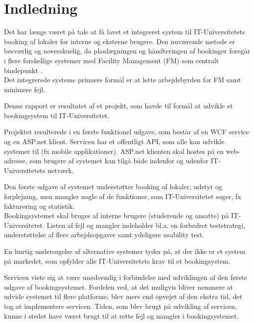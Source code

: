 \chapter{Indledning}
\label{Intro}
Det har længe været på tale at få lavet et integreret system til IT-Universitetets booking af lokaler for interne og eksterne brugere. Den nuværende metode er besværlig og uoverskuelig, da planlægningen og håndteringen af bookinger foregår i flere forskellige systemer med Facility Management (FM) som centralt bindepunkt \cite[Kap. A]{kravspec}.
\\Det integrerede systems primære formål er at lette arbejdsbyrden for FM samt minimere fejl. 

Denne rapport er resultatet af et projekt, som havde til formål at udvikle et bookingsystem  til IT-Universitetet.

Projektet resulterede i en første funktionel udgave, som består af en WCF service og en ASP.net klient. Servicen har et offentligt API, som alle kan udvikle systemer til (fx mobile applikationer). ASP.net klienten skal hostes på en web-adresse, som brugere af systemet kan tilgå både indenfor og udenfor IT-Universitetets netværk.

Den første udgave af systemet understøtter booking af lokaler, udstyr og forplejning, men mangler nogle af de funktioner, som IT-Universitetet søger, fx fakturering og statistik. 
\\Bookingsystemet skal bruges af interne brugere (studerende og ansatte) på IT-Universitetet. Listen af fejl og mangler indeholder bl.a. en forbedret teststrategi, understøttelse af flere arbejdsopgaver samt ydeligere usability test.

En hurtig undersøgelse af alternative systemer tyder på, at der ikke er et system på markedet, som opfylder alle IT-Universitetets krav til et bookingsystem.

Servicen viste sig at være unødvendig i forbindelse med udviklingen af den første udgave af bookingsystemet. Fordelen ved, at det muligvis bliver nemmere at udvide systemet til flere platforme, blev mere end opvejet af den ekstra tid, det tog at implementere servicen. Tiden, som blev brugt på udvikling af servicen, kunne i stedet have været brugt til at rette fejl og mangler i bookingsystemet. 